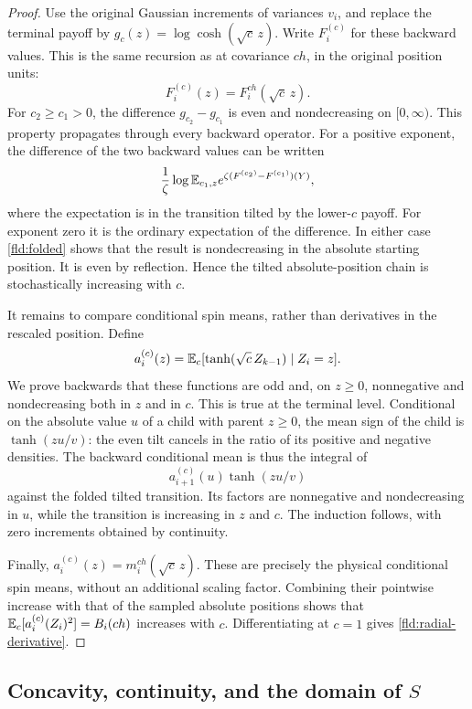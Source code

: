 \begin{proof}
Use the original Gaussian increments of variances $v_i$, and replace
the terminal payoff by
$g_c(z)=\log\cosh(\sqrt c\,z)$. Write $F_i^{(c)}$ for these backward
values. This is the same recursion as at covariance $ch$, in the
original position units:
\[
 F_i^{(c)}(z)=F_i^{ch}(\sqrt c\,z).
\]
For $c_2\geq c_1>0$, the difference $g_{c_2}-g_{c_1}$ is even and
nondecreasing on $[0,\infty)$. This property propagates through every
backward operator. For a positive exponent, the difference of the
two backward values can be written
\[
 \frac1\zeta\log\mathbb E_{c_1,z}
          e^{\zeta(F^{(c_2)}-F^{(c_1)})(Y)},
\]
where the expectation is in the transition tilted by the lower-$c$
payoff. For exponent zero it is the ordinary expectation of the
difference. In either case \eqref{fld:folded} shows that the result
is nondecreasing in the absolute starting position. It is even by
reflection. Hence the tilted absolute-position chain is stochastically
increasing with $c$.

It remains to compare conditional spin means, rather than derivatives
in the rescaled position. Define
\[
 a_i^{(c)}(z)=
 \mathbb E_c[\tanh(\sqrt c\,Z_{k-1})\mid Z_i=z].
\]
We prove backwards that these functions are odd and, on $z\geq0$,
nonnegative and nondecreasing both in $z$ and in $c$. This is true at
the terminal level. Conditional on the absolute value $u$ of a child
with parent $z\geq0$, the mean sign of the child is
$\tanh(zu/v)$: the even tilt cancels in the ratio of its positive and
negative densities. The backward conditional mean is thus the integral
of
\[
 a_{i+1}^{(c)}(u)\tanh(zu/v)
\]
against the folded tilted transition. Its factors are nonnegative and
nondecreasing in $u$, while the transition is increasing in $z$ and
$c$. The induction follows, with zero increments obtained by
continuity.

Finally, $a_i^{(c)}(z)=m_i^{ch}(\sqrt c\,z)$. These are precisely
the physical conditional spin means, without an additional scaling
factor. Combining their pointwise increase with that of the sampled
absolute positions shows that
$\mathbb E_c[a_i^{(c)}(Z_i)^2]=B_i(ch)$ increases with $c$. Differentiating
at $c=1$ gives \eqref{fld:radial-derivative}.
\end{proof}

\subsection{Concavity, continuity, and the domain of \texorpdfstring{$S$}{S}}

